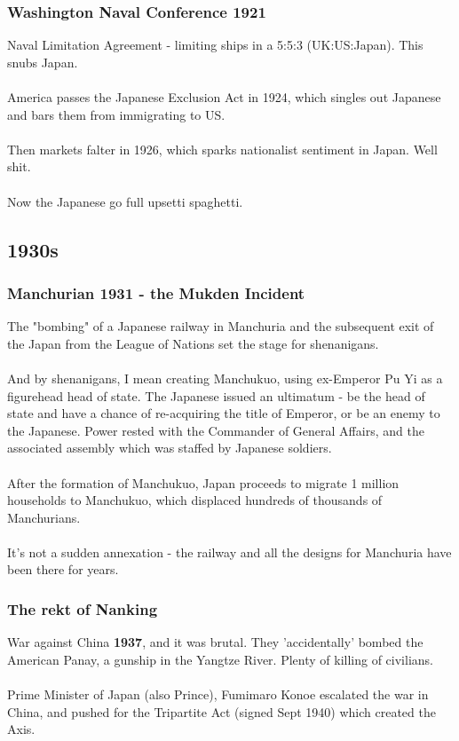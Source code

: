 \documentclass[a4paper]{article}
\begin{document}
\subsubsection{Washington Naval Conference 1921}
Naval Limitation Agreement - limiting ships in a 5:5:3 (UK:US:Japan). This snubs Japan.\\
\\
America passes the Japanese Exclusion Act in 1924, which singles out Japanese and bars them from immigrating to US.\\
\\
Then markets falter in 1926, which sparks nationalist sentiment in Japan. Well shit.\\
\\
Now the Japanese go full upsetti spaghetti.
\subsection{1930s}
\subsubsection{Manchurian 1931 - the Mukden Incident}
The "bombing" of a Japanese railway in Manchuria and the subsequent exit of the Japan from the League of Nations set the stage for shenanigans.\\
\\
And by shenanigans, I mean creating Manchukuo, using ex-Emperor Pu Yi as a figurehead head of state. The Japanese issued an ultimatum - be the head of state and have a chance of re-acquiring the title of Emperor, or be an enemy to the Japanese. Power rested with the Commander of General Affairs, and the associated assembly which was staffed by Japanese soldiers.\\
\\
After the formation of Manchukuo, Japan proceeds to migrate 1 million households to Manchukuo, which displaced hundreds of thousands of Manchurians.\\
\\
It's not a sudden annexation - the railway and all the designs for Manchuria have been there for years.
\subsubsection{The rekt of Nanking}
War against China \textbf{1937}, and it was brutal. They 'accidentally' bombed the American Panay, a gunship in the Yangtze River. Plenty of killing of civilians.\\
\\
Prime Minister of Japan (also Prince), Fumimaro Konoe escalated the war in China, and pushed for the Tripartite Act (signed Sept 1940) which created the Axis.
\end{document}
